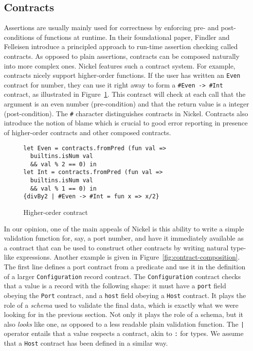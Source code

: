 \documentclass[sigplan,10pt,review,anonymous]{acmart}
\newcommand{\unsure}[2][1=]{}
\newcommand{\nickel}[1]{\lstinline[language=nickel]{#1}}
\begin{document}
\subsection*{Contracts}

Assertions are usually mainly used for correctness by enforcing pre- and
post-conditions of functions at runtime. In their foundational
paper\cite{FindlerFelleisenHOContracts}, Findler and Felleisen introduce a
principled approach to run-time assertion checking called contracts. As opposed
to plain assertions, contracts can be composed naturally into more complex ones.
Nickel features such a contract system. For example, contracts nicely support
higher-order functions. If the user has written an \nickel{Even} contract for
number, they can use it right away to form a \nickel{#Even -> #Int} contract, as
illustrated in Figure~\ref{fig:contract-higher-order}. This contract will check
at each call that the argument is an even number (pre-condition) and that the
return value is a integer (post-condition). The \nickel{#} character
distinguishes contracts in Nickel. Contracts also introduce the notion of blame
which is crucial to good error reporting in presence of higher-order contracts
and other composed contracts.

\begin{figure}
  \begin{center}
\begin{lstlisting}[language=nickel]
let Even = contracts.fromPred (fun val =>
  builtins.isNum val
  && val % 2 == 0) in
let Int = contracts.fromPred (fun val =>
  builtins.isNum val
  && val % 1 == 0) in
{divBy2 | #Even -> #Int = fun x => x/2}
\end{lstlisting}
  \end{center}
\caption{Higher-order contract}
\label{fig:contract-higher-order}
\end{figure}

In our opinion, one of the main appeals of Nickel is this ability to write a
simple validation function for, say, a port number, and have it immediately
available as a contract that can be used to construct other contracts by
writing natural type-like expressions. Another example is given in
Figure~\ref{fig:contract-composition}. The first line defines a port contract
from a predicate and use it in the definition of a larger
\lstinline+Configuration+ record contract. The \lstinline+Configuration+
contract checks that a value is a record with the following shape: it must have
a \lstinline+port+ field obeying the \lstinline+Port+ contract, and a
\lstinline+host+ field obeying a \lstinline+Host+ contract. It plays the role of
a \emph{schema} used to validate the final data, which is exactly what we were
looking for in the previous section. Not only it plays the role of a schema, but
it also \emph{looks} like one, as opposed to a less readable plain validation
function. The \lstinline+|+ operator entails that a value respects a contract,
akin to \lstinline+:+ for types. We assume that a \lstinline+Host+ contract has
been defined in a similar way. \unsure{What's missing in this section is an
example of how contracts differ from standard dynamic type checking on some
function. Namely, the quality of error messages.}
\end{document}

